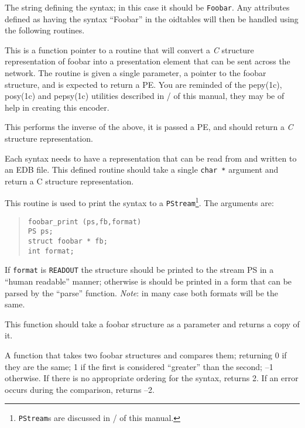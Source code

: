 \begin{describe}
\item [\verb"sntx":] The string defining the syntax; in this case it should
be \verb"Foobar". Any attributes defined as having the syntax ``Foobar'' in
the oidtables will then be handled using the following routines.

\item [\verb"enc":] This is a function pointer to a routine that will convert
a {\em C} structure representation 
of foobar into a presentation element that can
be sent across the network.
The routine is given a single parameter, a pointer to the foobar structure,
and is expected to return a PE.
You are reminded of the \man pepy(1c), \man posy(1c) and \man pepsy(1c) 
utilities described
in \volfour/ of this manual, they may be of help in creating this encoder.

\item [\verb"dec":] This performs the inverse of the above, it is passed a
PE, and should return a {\em C} structure representation.

\item [\verb"parse":] Each syntax needs to have a representation that can
be read from and written to an EDB file.  This defined routine should take
 a single
\verb"char *" argument and return a C structure representation.

\item [\verb"print":] This routine is used to print the syntax to a 
\verb+PStream+\footnote{\verb+PStream+s are discussed in \volone/ of this
manual.}.
The arguments are:
\begin{quote}\small\begin{verbatim}
foobar_print (ps,fb,format)
PS ps;
struct foobar * fb;
int format;
\end{verbatim}\end{quote}
If \verb"format" is \verb"READOUT" the structure should be printed to the
stream PS in a ``human readable'' manner; otherwise is should be printed
in a form that can be parsed by the ``parse'' function.
{\em Note}: in many case both formats will be the same.

\item [\verb"cpy":] This function should take a foobar structure as a
parameter and returns a copy of it.

\item [\verb"cmp":] A function that takes two foobar structures and compares
them; returning 0 if they are the same; 1 if the first is considered
``greater'' than the second; --1 otherwise.
If there is no appropriate ordering for the syntax, returns 2.
If an error occurs during the comparison, returns --2.


\end{describe}
